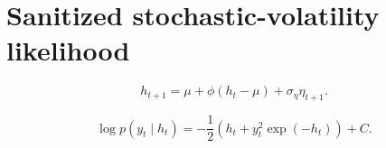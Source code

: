 \section{Sanitized stochastic-volatility likelihood}

\begin{equation}\label{eq:dept-sv-transition}
h_{t+1} = \mu + \phi(h_t-\mu) + \sigma_\eta \eta_{t+1}.
\end{equation}

\begin{equation}\label{eq:dept-sv-likelihood}
\log p(y_t\mid h_t) = -\frac{1}{2}\left(h_t + y_t^2\exp(-h_t)\right) + C.
\end{equation}
